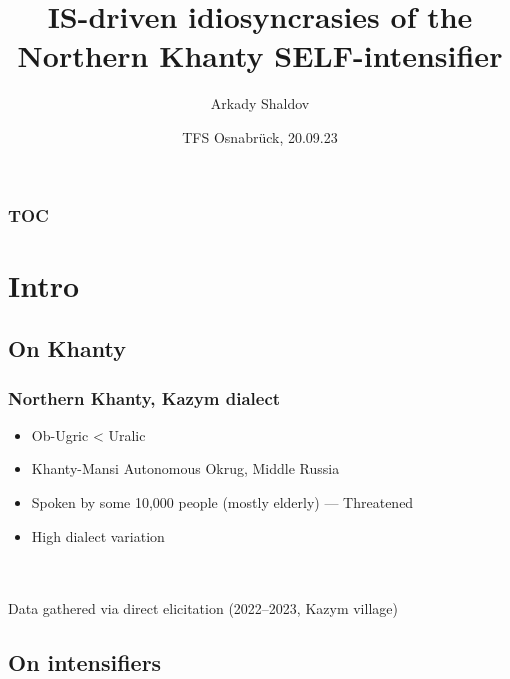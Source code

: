 \documentclass{beamer}
\title{IS-driven idiosyncrasies of the Northern Khanty SELF-intensifier}
\author{Arkady Shaldov}
\institute{HSE Moscow}
\date{TFS Osnabrück, 20.09.23}
\begin{document}

\begin{frame}
    \titlepage
\end{frame}

\begin{frame}
    \frametitle{TOC}

    \tableofcontents

\end{frame}

\section{Intro}
\subsection{On Khanty}

\begin{frame}
    \frametitle{Northern Khanty, Kazym dialect}
    
    \begin{itemize}
        \item Ob-Ugric < Uralic
        \item Khanty-Mansi Autonomous Okrug, Middle Russia
        \item Spoken by some 10,000 people (mostly elderly) --- Threatened
        \item High dialect variation
    \end{itemize}
    
    ~\\~\\ Data gathered via direct elicitation (2022--2023, Kazym village)
    
\end{frame}

\subsection{On intensifiers}
\end{document}

